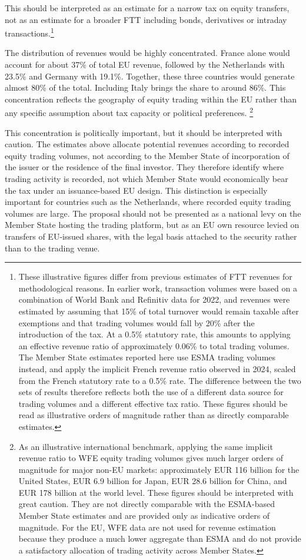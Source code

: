 \documentclass[../../main]{subfiles}
\begin{document}
This should be interpreted as an estimate for a narrow tax on equity transfers, not as an estimate for a broader FTT including bonds, derivatives or intraday transactions.\footnote{These illustrative figures differ from previous estimates of FTT revenues \citep{CapelleBlancardPersaud2025} for methodological reasons. In earlier work, transaction volumes were based on a combination of World Bank and Refinitiv data for 2022, and revenues were estimated by assuming that 15\% of total turnover would remain taxable after exemptions and that trading volumes would fall by 20\% after the introduction of the tax. At a 0.5\% statutory rate, this amounts to applying an effective revenue ratio of approximately 0.06\% to total trading volumes. The Member State estimates reported here use ESMA trading volumes instead, and apply the implicit French revenue ratio observed in 2024, scaled from the French statutory rate to a 0.5\% rate. The difference between the two sets of results therefore reflects both the use of a different data source for trading volumes and a different effective tax ratio. These figures should be read as illustrative orders of magnitude rather than as directly comparable estimates.}

The distribution of revenues would be highly concentrated. France alone would account for about 37\% of total EU revenue, followed by the Netherlands with 23.5\% and Germany with 19.1\%. Together, these three countries would generate almost 80\% of the total. Including Italy brings the share to around 86\%. This concentration reflects the geography of equity trading within the EU rather than any specific assumption about tax capacity or political preferences.
\footnote{As an illustrative international benchmark, applying the same implicit revenue ratio to WFE equity trading volumes gives much larger orders of magnitude for major non-EU markets: approximately EUR 116 billion for the United States, EUR 6.9 billion for Japan, EUR 28.6 billion for China, and EUR 178 billion at the world level. These figures should be interpreted with great caution. They are not directly comparable with the ESMA-based Member State estimates and are provided only as indicative orders of magnitude. For the EU, WFE data are not used for revenue estimation because they produce a much lower aggregate than ESMA and do not provide a satisfactory allocation of trading activity across Member States.}


This concentration is politically important, but it should be interpreted with caution. The estimates above allocate potential revenues according to recorded equity trading volumes, not according to the Member State of incorporation of the issuer or the residence of the final investor. They therefore identify where trading activity is recorded, not which Member State would economically bear the tax under an issuance-based EU design. This distinction is especially important for countries such as the Netherlands, where recorded equity trading volumes are large. The proposal should not be presented as a national levy on the Member State hosting the trading platform, but as an EU own resource levied on transfers of EU-issued shares, with the legal basis attached to the security rather than to the trading venue.
\end{document}
